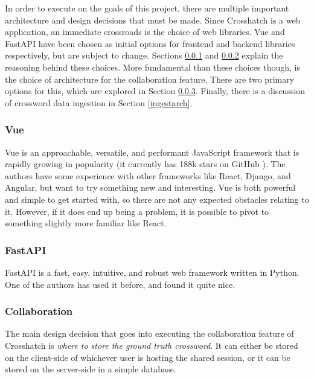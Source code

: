 \documentclass{article}
\begin{document}
In order to execute on the goals of this project, there are multiple important architecture and design decisions that must be made.
Since Crosshatch
is a web application, an immediate crossroads is the choice of web libraries. Vue and FastAPI have been chosen
as initial options for frontend and backend libraries respectively, but are subject to change. Sections \ref{vue}
and \ref{fastapi} explain the reasoning behind these choices.
More fundamental than these choices though, is the choice of architecture for the collaboration feature. There are two primary
options for this, which are explored in Section \ref{collabarch}. Finally, there is a discussion of crossword data ingestion in
Section \ref{ingestarch}.

\subsubsection{Vue}
\label{vue}
Vue \cite{vue} is an approachable, versatile, and performant JavaScript framework that is rapidly growing
in popularity (it currently has 188k stars on GitHub \cite{vuegithub}). The authors have some experience
with other frameworks like React, Django, and Angular, but want to try something new and interesting.
Vue is both powerful and simple to get started with, so there are not any expected obstacles
relating to it. However, if it does end up being a problem, it is possible to pivot to something
slightly more familiar like React.

\subsubsection{FastAPI}
\label{fastapi}
FastAPI \cite{fastapi} is a fast, easy, intuitive, and robust web framework written in Python. One of the authors
has used it before, and found it quite nice.

\subsubsection{Collaboration}
\label{collabarch}
The main design decision that goes into executing the collaboration feature of Crosshatch is \textit{where to
  store the ground truth crossword}. It can either be stored on the client-side of whichever user is
hosting the shared session, or it can be stored on the server-side in a simple database.
\end{document}
